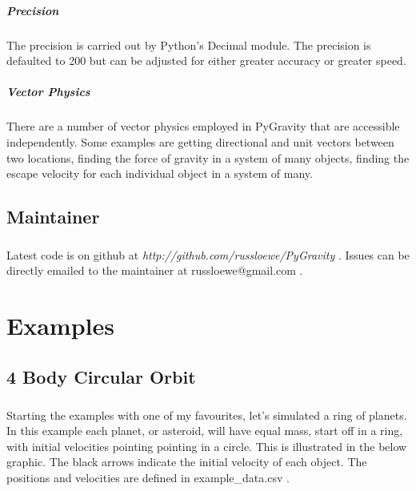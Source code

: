 \documentclass[15pt]{report}
\begin{document}
\paragraph{Precision}The precision is carried out by Python's Decimal module. The precision is defaulted to 200 but can be 
adjusted for either greater accuracy or greater speed.

\paragraph{Vector Physics} There are a number of vector physics employed in PyGravity that are accessible independently. Some 
examples are getting directional and unit vectors between two locations, finding the force of gravity in a system of many objects, 
finding the escape velocity for each individual object in a system of many.

\section{Maintainer}
\paragraph{} Latest code is on github at \textit{http://github.com/russloewe/PyGravity} . Issues can be directly emailed to the 
maintainer at russloewe@gmail.com . 

\chapter{Examples}
\section{4 Body Circular Orbit}
\paragraph{}Starting the examples with one of my favourites, let's simulated a ring of planets. In this example each planet, or 
asteroid, will have equal mass, start off in a ring, with initial velocities pointing pointing in a circle. This is illustrated 
in the below graphic. The black arrows indicate the initial velocity of each object. The positions and velocities are defined in
 example\_data.csv .
\end{document}
